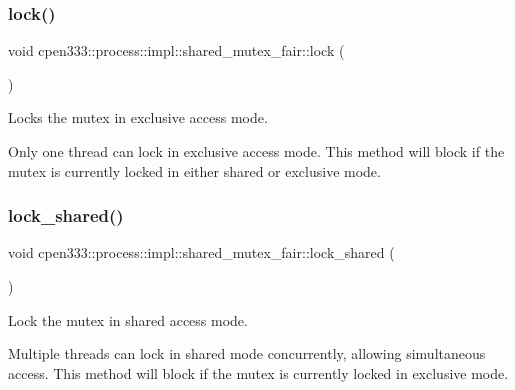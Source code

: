 \subsubsection{\texorpdfstring{lock()}{lock()}}
{\footnotesize\ttfamily void cpen333\+::process\+::impl\+::shared\+\_\+mutex\+\_\+fair\+::lock (\begin{DoxyParamCaption}{ }\end{DoxyParamCaption})\hspace{0.3cm}{\ttfamily [inline]}}



Locks the mutex in exclusive access mode. 

Only one thread can lock in exclusive access mode. This method will block if the mutex is currently locked in either shared or exclusive mode. \mbox{\label{classcpen333_1_1process_1_1impl_1_1shared__mutex__fair_a11641159a61a83eda9713891f9f29159}} 
\subsubsection{\texorpdfstring{lock\+\_\+shared()}{lock\_shared()}}
{\footnotesize\ttfamily void cpen333\+::process\+::impl\+::shared\+\_\+mutex\+\_\+fair\+::lock\+\_\+shared (\begin{DoxyParamCaption}{ }\end{DoxyParamCaption})\hspace{0.3cm}{\ttfamily [inline]}}



Lock the mutex in shared access mode. 

Multiple threads can lock in shared mode concurrently, allowing simultaneous access. This method will block if the mutex is currently locked in exclusive mode. \mbox{\label{classcpen333_1_1process_1_1impl_1_1shared__mutex__fair_aaac6ea293ec760cb35eefeb004503e9a}} 
